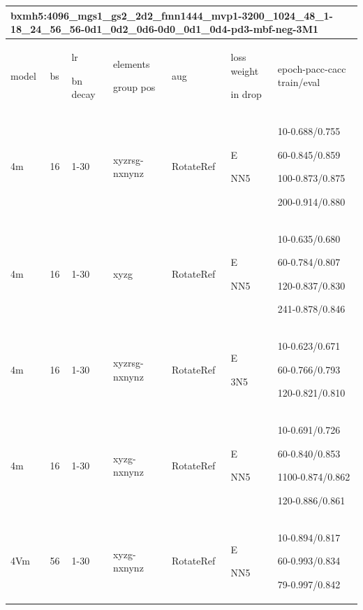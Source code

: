 \documentclass{article}
\begin{document}
\begin{tabular}{|p{1.5cm}|p{1.5cm}|p{1cm}|p{1.5cm}|p{1.5cm}|p{1.5cm}|p{5cm}| }
	\hline
	\multicolumn{7}{|p{14cm}|}{bxmh5:4096\_mgs1\_gs2\_2d2\_fmn1444\_mvp1-3200\_1024\_48\_1-18\_24\_56\_56-0d1\_0d2\_0d6-0d0\_0d1\_0d4-pd3-mbf-neg-3M1\par 
	}\\
	\hline
	model & bs& lr\par bn decay & elements\par group pos & aug & loss weight\par in drop & epoch-pacc-cacc train/eval \\
	\hline
	
	4m & 16 & 1-30 & xyzrsg-nxnynz & RotateRef & E\par NN5 & 10-0.688/0.755\par 60-0.845/0.859\par 100-0.873/0.875\par 200-0.914/0.880\\
	\hline 
	4m & 16 & 1-30 & xyzg & RotateRef & E\par NN5 & 10-0.635/0.680\par 60-0.784/0.807\par 120-0.837/0.830\par 241-0.878/0.846\\
	\hline 
	4m & 16 & 1-30 & xyzrsg-nxnynz & RotateRef & E\par 3N5 & 10-0.623/0.671\par 60-0.766/0.793\par 120-0.821/0.810\\
	\hline 
	4m & 16 & 1-30 & xyzg-nxnynz & RotateRef & E\par NN5 & 10-0.691/0.726\par 60-0.840/0.853\par 1100-0.874/0.862\par 120-0.886/0.861\\
	\hline 
	4Vm & 56 & 1-30 & xyzg-nxnynz & RotateRef & E\par NN5 & 10-0.894/0.817\par 60-0.993/0.834\par 79-0.997/0.842\\
	\hline
\end{tabular}
\par
\noindent
\end{document}
